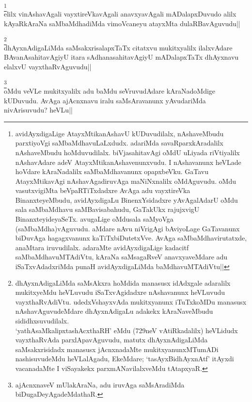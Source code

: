 \begin{artha} 
\footnote[1]{avidAyxdigaLige AtayxMtikanAshavU kUDuvudilalx, 
nAshaveMbudu parxtiyoVgi saMbaMdhavuLaLxdudx. adariMda 
savaRparxkAradalilx nAshaveMbudu hoMduvudilalx. biVjasahitavAgi oMdU 
uLiyada riVtiyalilx nAshavAdare adeV AtayxMtikanAshavenunxvudu. I 
nAshavanunx heVLade hoVdare kAraNadalilx saMbaMdhavanunx opapxbeVku. 
GaTavu AtayxMtikavAgi nAshavAgadiruvAga maNiNxnalilx oMdAguvudu. oMdu 
vasutxvigiMta beVpaRTiTxdadxre AvAga adu vayxtireVka BinanxteyeMbudu, 
avidAyxdigaLu BinenxYsidadxre yAvAgalAdarU oMdu sala saMbaMdhavu 
saMBavisabahudu, GaTakUkx rajujxvigU BinanxteyideyaSeTx. avugaLige 
oMdusala saMyoVga (saMbaMdha)vAguvudu. aMdare nAvu niVrigAgi 
bAviyoLage GaTavanunx biDuvAga hagagxvanunx kaTiTxbiDutetxVve. AvAga 
saMbaMdhavirutatxde, anaMtara iruvudilalx. adaraMte avidAyxdigaLige 
kadacitf saMbaMdhavuMTAdiVtu, kAraNa saMsagaRveV anavxyaveMdare adu 
iSaTxvAdadxriMda punaH avidAyxdigaLiMda baMdhavuMTAdiVtu||}\\
elilx vinAshavAgali vayxtireVkavAgali anavxyavAgali mADalapxDuvudo 
alilx kAyaRkAraNa saMbaMdhadiMda vimoVcaneyu atayxMta dulaRBavAguvudu||
\end{artha}


\begin{artha} 
\footnote[2]{dhAyxnAdigaLiMda saMsAkxra hoMdida manasusx idAdxgale 
adaralilx mukitxyeMdu heVLuvudu iSaTxvAgidadxre nAshavanunx heVLuvudu 
vayxthaRvAdiVtu. udedxVshayxvAda mukitxyanunx iTuTxkoMDu manasusx 
nAshavAguvudeMdare dhAyxnAdigaLu adakekx kAraNaveMbudu 
sididhxsuvudilalx.\\
`yathAsaMkalipxtashAcxthaRH' eMdu (729neV vAtiRkadalilx) heVLidudx 
vayxthaRvAda parxlApavAguvudu, matutx dhAyxnAdigaLiMda saMsakxrisidadx 
manasusx jAcnxnadaMte mukitxyanunxMTumADi nashisuvudeMdu heVLalAgadu, 
EkeMdare; `tasAyxBidhAyxnAtf' itAyxdi vacanadaMte I viSayakekx 
parxmANavilalxveMdu tAtapxyaR.}\\
dhAyxnAdigaLiMda saMsakxrisalapxTaTx citatxvu mukitxyalilx ilalxvAdare 
BAvanAsahitavAgiyU itara sAdhanasahitavAgiyU mADalapxTaTx dhAyxnavu 
elalxvU vayxthaRvAguvudu||
\end{artha}


\begin{artha} 
\footnote[1]{ajAcnxnaveV mUlakAraNa, adu iruvAga saMsAradiMda 
biDugaDeyAgadeMdathaR.}\\
oMdu veVLe mukitxyalilx adu baMdu seVruvudAdare kAraNadoMdige 
kUDuvudu. AvAga ajAcnxnavu iralu saMsAravanunx yAvudariMda 
nivArisuvudu? heVLu||
\end{artha}

